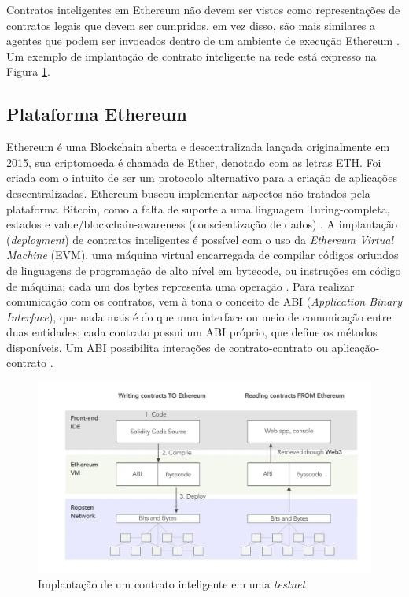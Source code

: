 Contratos inteligentes em Ethereum não devem ser vistos como representações de contratos legais que devem ser cumpridos, em vez disso, são mais similares a agentes que podem ser invocados dentro de um ambiente de execução Ethereum \cite{Xu2019-qi}. Um exemplo de implantação de contrato inteligente na rede está expresso na Figura \ref{fig:contrato_inteligente}.


\subsection{Plataforma Ethereum}
Ethereum é uma Blockchain aberta e descentralizada lançada originalmente em 2015, sua criptomoeda é chamada de Ether, denotado com as letras ETH. Foi criada com o intuito de ser um protocolo alternativo para a criação de aplicações descentralizadas. Ethereum buscou implementar aspectos não tratados pela plataforma Bitcoin, como a falta de suporte a uma linguagem Turing-completa, estados e value/blockchain-awareness (conscientização de dados) \cite{Buterin2013}. A implantação (\emph{deployment}) de contratos inteligentes é possível com o uso da \emph{Ethereum Virtual Machine} (EVM), uma máquina virtual encarregada de compilar códigos oriundos de linguagens de programação de alto nível em bytecode, ou instruções em código de máquina; cada um dos bytes representa uma operação \cite{Buterin2013}. Para realizar comunicação com os contratos, vem à tona o conceito de ABI (\emph{Application Binary Interface}), que nada mais é do que uma interface ou meio de comunicação entre duas entidades; cada contrato possui um ABI próprio, que define os métodos disponíveis. Um ABI possibilita interações de contrato-contrato ou aplicação-contrato \cite{eiki_2019}.

\begin{figure}
    \centering
    \includegraphics[width=1\textwidth]{img/Cap2/ethereum contracts.png}
    \caption{Implantação de um contrato inteligente em uma \emph{testnet} \cite{eiki_2019}}
    \label{fig:contrato_inteligente}
\end{figure}

